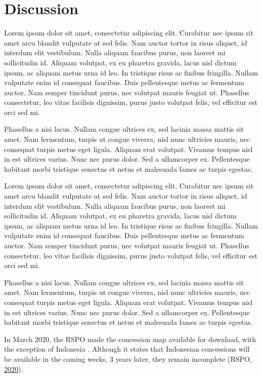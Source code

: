 \documentclass[
  letterpaper,
  DIV=11,
  numbers=noendperiod]{scrreprt}
\begin{document}
\hypertarget{discussion}{%
\chapter{Discussion}\label{discussion}}

Lorem ipsum dolor sit amet, consectetur adipiscing elit. Curabitur nec
ipsum sit amet arcu blandit vulputate at sed felis. Nam auctor tortor in
risus aliquet, id interdum elit vestibulum. Nulla aliquam faucibus
purus, non laoreet mi sollicitudin id. Aliquam volutpat, ex eu pharetra
gravida, lacus nisl dictum ipsum, ac aliquam metus urna id leo. In
tristique risus ac finibus fringilla. Nullam vulputate enim id consequat
faucibus. Duis pellentesque metus ac fermentum auctor. Nam semper
tincidunt purus, nec volutpat mauris feugiat ut. Phasellus consectetur,
leo vitae facilisis dignissim, purus justo volutpat felis, vel efficitur
est orci sed mi.

Phasellus a nisi lacus. Nullam congue ultrices ex, sed lacinia massa
mattis sit amet. Nam fermentum, turpis ut congue viverra, nisl nunc
ultricies mauris, nec consequat turpis metus eget ligula. Aliquam erat
volutpat. Vivamus tempus nisl in est ultrices varius. Nunc nec purus
dolor. Sed a ullamcorper ex. Pellentesque habitant morbi tristique
senectus et netus et malesuada fames ac turpis egestas.

Lorem ipsum dolor sit amet, consectetur adipiscing elit. Curabitur nec
ipsum sit amet arcu blandit vulputate at sed felis. Nam auctor tortor in
risus aliquet, id interdum elit vestibulum. Nulla aliquam faucibus
purus, non laoreet mi sollicitudin id. Aliquam volutpat, ex eu pharetra
gravida, lacus nisl dictum ipsum, ac aliquam metus urna id leo. In
tristique risus ac finibus fringilla. Nullam vulputate enim id consequat
faucibus. Duis pellentesque metus ac fermentum auctor. Nam semper
tincidunt purus, nec volutpat mauris feugiat ut. Phasellus consectetur,
leo vitae facilisis dignissim, purus justo volutpat felis, vel efficitur
est orci sed mi.

Phasellus a nisi lacus. Nullam congue ultrices ex, sed lacinia massa
mattis sit amet. Nam fermentum, turpis ut congue viverra, nisl nunc
ultricies mauris, nec consequat turpis metus eget ligula. Aliquam erat
volutpat. Vivamus tempus nisl in est ultrices varius. Nunc nec purus
dolor. Sed a ullamcorper ex. Pellentesque habitant morbi tristique
senectus et netus et malesuada fames ac turpis egestas.

In March 2020, the RSPO made the concession map available for download,
with the exception of Indonesia . Although it states that Indonesian
concessions will be available in the coming weeks, 3 years later, they
remain incomplete (RSPO,
\protect\hyperlink{ref-rspoRSPOMEMBERSCONCESSION2020}{2020}).
\end{document}
